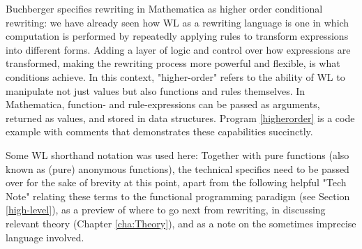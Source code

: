 Buchberger specifies rewriting in Mathematica as higher order conditional rewriting: we have already seen how WL as a rewriting language is one in which computation is performed by repeatedly applying rules to transform expressions into different forms. Adding a layer of logic and control over how expressions are transformed, making the rewriting process more powerful and flexible, is what conditions achieve. In this context, "higher-order" refers to the ability of WL to manipulate not just values but also functions and rules themselves. In Mathematica, function- and rule-expressions can be passed as arguments, returned as values, and stored in data structures. Program \ref{higherorder} is a code example with comments that demonstrates these capabilities succinctly.


Some WL shorthand notation was used here: Together with pure functions (also known as (pure) anonymous functions), the technical specifics need to be passed over for the sake of brevity at this point, apart from the following helpful "Tech Note" relating these terms to the functional programming paradigm (see Section \ref{high-level}), as a preview of where to go next from rewriting, in discussing relevant theory (Chapter \ref{cha:Theory}), and as a note on the sometimes imprecise language involved.


